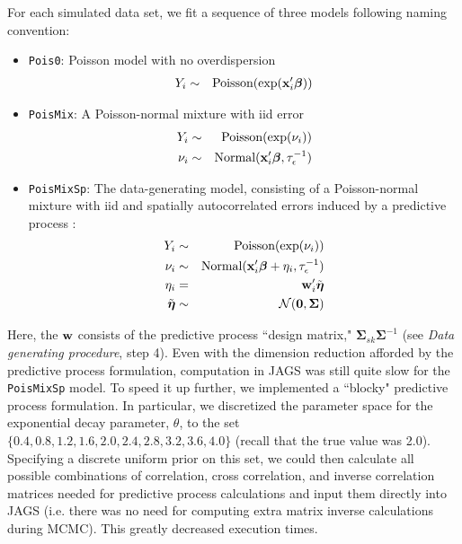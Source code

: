 \documentclass[12pt,fleqn]{article}
\def\bfx{{\bf x}}
\def\bfeta{\boldsymbol{\eta}}
\def\bfbeta{\boldsymbol{\beta}}
\def\bfSigma{\boldsymbol{\Sigma}}
\begin{document}
\begin{flushleft}
For each simulated data set, we fit a sequence of three models following naming convention:
      \begin{itemize}
        \item \texttt{Pois0}: Poisson model with no overdispersion
         \begin{eqnarray*}
           Y_i & \sim & \textrm{Poisson}(\exp(\bfx_i^\prime \bfbeta)) \\
         \end{eqnarray*}
        \item \texttt{PoisMix}: A Poisson-normal mixture with iid error
         \begin{eqnarray*}
           Y_i & \sim & \textrm{Poisson}(\exp(\nu_i)) \\
           \nu_i & \sim & \textrm{Normal}(\bfx_i^\prime \bfbeta, \tau_\epsilon^{-1})\\
          \end{eqnarray*}
        \item \texttt{PoisMixSp}: The data-generating model, consisting of a Poisson-normal mixture with iid and spatially autocorrelated errors induced by a predictive process \citep[cf.][]{BanerjeeEtAl2008}:
          \begin{eqnarray*}
           Y_i & \sim & \textrm{Poisson}(\exp(\nu_i)) \\
           \nu_i & \sim & \textrm{Normal}(\bfx_i^\prime \bfbeta + \eta_i, \tau_\epsilon^{-1}) \\
           \eta_i & = & {\bf w}_i^\prime \tilde{\bfeta} \\
           \tilde{\bfeta} & \sim & \mathcal{N}(\textbf{0},\bfSigma) \\
          \end{eqnarray*}
      \end{itemize}
Here, the ${\bf w}$ consists of the predictive process ``design matrix," $\bfSigma_{sk} \bfSigma^{-1}$ (see \textit{Data generating procedure}, step 4).  Even with the dimension reduction afforded by the predictive process formulation, computation in JAGS was still quite slow for the \texttt{PoisMixSp} model.  To speed it up further, we implemented a ``blocky" predictive process formulation.  In particular, we discretized the parameter space for the exponential decay parameter, $\theta$, to the set $\{0.4, 0.8, 1.2, 1.6, 2.0, 2.4, 2.8, 3.2, 3.6, 4.0\}$ (recall that the true value was 2.0).  Specifying a discrete uniform prior on this set, we could then calculate all possible combinations of correlation, cross correlation, and inverse correlation matrices needed for predictive process calculations and input them directly into JAGS (i.e. there was no need for computing extra matrix inverse calculations during MCMC).  This greatly decreased execution times.


\end{flushleft}
\end{document}
